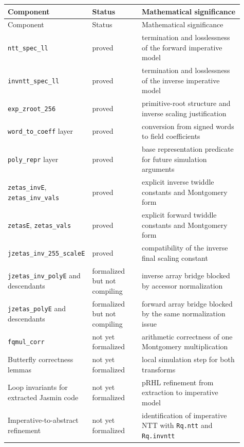 \documentclass[11pt]{article}
\begin{document}
\begin{center}
\begin{longtable}{p{0.27\linewidth} p{0.21\linewidth} p{0.43\linewidth}}
\toprule
Component & Status & Mathematical significance \\
\midrule
\endfirsthead
\toprule
Component & Status & Mathematical significance \\
\midrule
\endhead
\texttt{ntt\_spec\_ll} & proved & termination and losslessness of the forward imperative model \\
\texttt{invntt\_spec\_ll} & proved & termination and losslessness of the inverse imperative model \\
\texttt{exp\_zroot\_256} & proved & primitive-root structure and inverse scaling justification \\
\texttt{word\_to\_coeff} layer & proved & conversion from signed words to field coefficients \\
\texttt{poly\_repr} layer & proved & base representation predicate for future simulation arguments \\
\texttt{zetas\_invE}, \texttt{zetas\_inv\_vals} & proved & explicit inverse twiddle constants and Montgomery form \\
\texttt{zetasE}, \texttt{zetas\_vals} & proved & explicit forward twiddle constants and Montgomery form \\
\texttt{jzetas\_inv\_255\_scaleE} & proved & compatibility of the inverse final scaling constant \\
\texttt{jzetas\_inv\_polyE} and descendants & formalized but not compiling & inverse array bridge blocked by accessor normalization \\
\texttt{jzetas\_polyE} and descendants & formalized but not compiling & forward array bridge blocked by the same normalization issue \\
\texttt{fqmul\_corr} & not yet formalized & arithmetic correctness of one Montgomery multiplication \\
Butterfly correctness lemmas & not yet formalized & local simulation step for both transforms \\
Loop invariants for extracted Jasmin code & not yet formalized & pRHL refinement from extraction to imperative model \\
Imperative-to-abstract refinement & not yet formalized & identification of imperative NTT with \texttt{Rq.ntt} and \texttt{Rq.invntt} \\
\bottomrule
\end{longtable}
\end{center}
\end{document}
